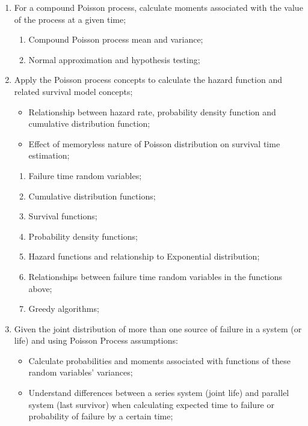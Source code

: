 \begin{outcomes}
\begin{enumerate}
\begin{knowledge}
\begin{enumerate}[label = \alph*.]
	\end{enumerate}
	\end{knowledge}
\tcbline
	\item	For a compound Poisson process, calculate moments associated with the value of the process at a given time;
	\begin{knowledge}
	\begin{enumerate}[label = \alph*.]
		\item	Compound Poisson process mean and variance;
		\item	Normal approximation and hypothesis testing;
	\end{enumerate}
	\end{knowledge}
\tcbline
	\item	Apply the Poisson process concepts to calculate the hazard function and related survival model concepts;
		\begin{itemize}
		\item	Relationship between hazard rate, probability density function and cumulative distribution function;
		\item	Effect of memoryless nature of Poisson distribution on survival time estimation;
		\end{itemize}
	\begin{knowledge}
	\begin{enumerate}[label = \alph*.]
		\item	Failure time random variables;
		\item	Cumulative distribution functions;
		\item	Survival functions;
		\item	Probability density functions;
		\item	Hazard functions and relationship to Exponential distribution;
		\item	Relationships between failure time random variables in the functions above;
		\item	Greedy algorithms;
	\end{enumerate}
	\end{knowledge}
\tcbline
	\item	Given the joint distribution of more than one source of failure in a system (or life) and using Poisson Process assumptions:
		\begin{itemize}
		\item	Calculate probabilities and moments associated with functions of these random variables' variances;
		\item	Understand differences between a series system (joint life) and parallel system (last survivor) when calculating expected time to failure or probability of failure by a certain time;

\end{itemize}
\end{enumerate}
\end{outcomes}
